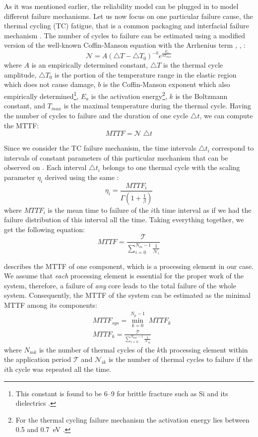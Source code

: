 As it was mentioned earlier, the reliability model can be plugged in to model different failure mechanisms. Let us now focus on one particular failure cause, the thermal cycling (TC) fatigue, that is a common packaging and interfacial failure mechanism \cite{jedec2010}. The number of cycles to failure can be estimated using a modified version of the well-known Coffin-Manson equation with the Arrhenius term \cite{jedec2010}, \cite{xiang2010}, \cite{ciappa2003}:
\begin{equation} \label{eq:cycles-to-failure}
  \mathcal{N} = A (\triangle T - \triangle T_0)^{-b} e^{\frac{E_a}{k T_{max}}}
\end{equation}
where $A$ is an empirically determined constant, $\triangle T$ is the thermal cycle amplitude, $\triangle T_0$ is the portion of the temperature range in the elastic region which does not cause damage, $b$ is the Coffin-Manson exponent which also empirically determined\footnote{This constant is found to be 6--9 for brittle fracture such as Si and its dielectrics \cite{jedec2010}.}, $E_{a}$ is the activation energy\footnote{For the thermal cycling failure mechanism the activation energy lies between 0.5 and 0.7~eV \cite{vigrass}.}, $k$ is the Boltzmann constant, and $T_{max}$ is the maximal temperature during the thermal cycle. Having the number of cycles to failure and the duration of one cycle $\triangle t$, we can compute the MTTF:
\[
  MTTF = \mathcal{N} \; \triangle t
\]

Since we consider the TC failure mechanism, the time intervals $\triangle t_i$ correspond to intervals of constant parameters of this particular mechanism that can be observed on . Each interval $\triangle t_i$ belongs to one thermal cycle with the scaling parameter $\eta_i$ derived using the same :
\[
  \eta_i = \frac{MTTF_i}{\Gamma(1 + \frac{1}{\beta})}
\]
where $MTTF_i$ is the mean time to failure of the $i$th time interval as if we had the failure distribution of this interval all the time. Taking everything together, we get the following equation:
\begin{equation} \label{eq:one-mttf}
  MTTF = \frac{\mathcal{T}}{\sum_{i=0}^{N_m - 1} \frac{1}{\mathcal{N}_i}}
\end{equation}

 describes the MTTF of one component, which is a processing element in our case. We assume that \emph{each} processing element is essential for the proper work of the system, therefore, a failure of \emph{any} core leads to the total failure of the whole system. Consequently, the MTTF of the system can be estimated as the minimal MTTF among its components:
\begin{align*}
  & MTTF_{sys} = \min_{k=0}^{N_p - 1} \; MTTF_k \\
  & MTTF_k = \frac{\mathcal{T}}{\sum_{i=0}^{N_{mk} - 1} \frac{1}{\mathcal{N}_{ik}}}
\end{align*}
where $N_{mk}$ is the number of thermal cycles of the $k$th processing element within the application period $\mathcal{T}$ and $\mathcal{N}_{ik}$ is the number of thermal cycles to failure if the $i$th cycle was repeated all the time.


